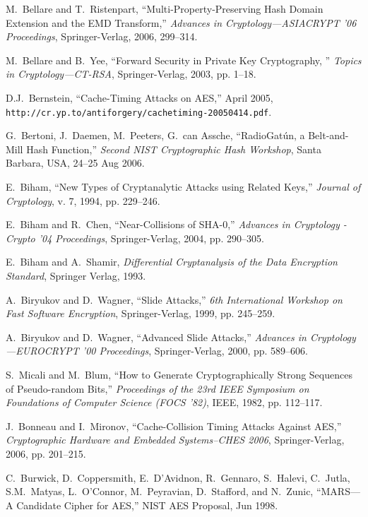 \documentclass[11pt,twoside]{article}
\begin{document}
{\begin{thebibliography}{19}
 M.~Bellare and T.~Ristenpart, ``Multi-Property-Preserving Hash Domain Extension and the EMD Transform,'' {\it Advances in Cryptology---ASIACRYPT '06 Proceedings}, Springer-Verlag, 2006, 299--314.

 M.~Bellare and B.~Yee, ``Forward Security in Private Key Cryptography, '' {\it Topics in Cryptology---CT-RSA}, Springer-Verlag, 2003, pp. 1--18.

 D.J.~Bernstein, ``Cache-Timing Attacks on AES,'' April 2005, {\tt http://cr.yp.to/antiforgery/cachetiming-20050414.pdf}.

 G.~Bertoni, J.~Daemen, M.~Peeters, G.~can Assche, ``RadioGat\'{u}n, a Belt-and-Mill Hash Function,'' {\it Second NIST Cryptographic Hash Workshop}, Santa Barbara, USA, 24--25 Aug 2006.

  E.~Biham, ``New Types of Cryptanalytic Attacks using Related Keys,'' {\it Journal of Cryptology}, v. 7, 1994, pp. 229--246.

 E.~Biham and R.~Chen, ``Near-Collisions of SHA-0,'' {\it Advances in Cryptology - Crypto '04 Proceedings}, Springer-Verlag, 2004, pp. 290--305.

  E.~Biham and A.~Shamir, {\it Differential Cryptanalysis of the Data Encryption Standard}, Springer Verlag, 1993.

 A.~Biryukov and D.~Wagner, ``Slide Attacks,'' {\it 6th International Workshop on Fast Software Encryption}, Springer-Verlag, 1999, pp. 245--259.

 A.~Biryukov and D.~Wagner, ``Advanced Slide Attacks,'' {\it Advances in Cryptology---EUROCRYPT '00 Proceedings}, Springer-Verlag, 2000, pp. 589--606.

 S.~Micali and M.~Blum, ``How to Generate Cryptographically Strong Sequences of Pseudo-random Bits,'' {\it Proceedings of the 23rd IEEE Symposium on Foundations of Computer Science (FOCS '82)}, IEEE, 1982, pp. 112--117.


 J.~Bonneau and I.~Mironov, ``Cache-Collision Timing Attacks Against AES,'' {\it Cryptographic Hardware and Embedded Systems--CHES 2006}, Springer-Verlag, 2006, pp. 201--215.

 C.~Burwick, D.~Coppersmith, E.~D'Avidnon, R.~Gennaro, S.~Halevi, C.~Jutla, S.M.~Matyas, L.~O'Connor, M.~Peyravian, D.~Stafford, and N.~Zunic, ``MARS---A Candidate Cipher for AES,'' NIST AES Proposal, Jun 1998.


\end{thebibliography}}
\end{document}
